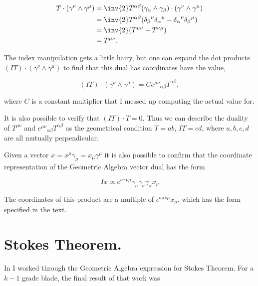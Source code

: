 \begin{align*}
T \cdot (\gamma^\nu \wedge \gamma^\mu)
&= 
\inv{2} T^{\alpha \beta} (\gamma_\alpha \wedge \gamma_\beta ) \cdot (\gamma^\nu \wedge \gamma^\mu) \\
&= 
\inv{2} T^{\alpha \beta} ( {\delta_\beta}^\nu {\delta_\alpha}^\mu -{\delta_\alpha}^\nu {\delta_\beta}^\mu ) \\
&= 
\inv{2} (T^{\mu \nu} - T^{\nu \mu}) \\
&= 
T^{\mu \nu}.
\end{align*}

The index manipulation gets a little hairy, but one can expand the dot products $(I T) \cdot (\gamma^\nu \wedge \gamma^\mu)$ to find that this dual has coordinates have the value,

\begin{equation}\label{eqn:antisymmetricTensorTx:530}
(I T) \cdot (\gamma^\nu \wedge \gamma^\mu) = C {e^{\mu \nu}}_{\alpha \beta} T^{\alpha \beta},
\end{equation}

where $C$ is a constant multiplier that I messed up computing the actual value for.

It is also possible to verify that $(IT) \cdot T = 0$.  Thus we can describe the duality of $T^{\mu \nu}$ and ${e^{\mu \nu}}_{\alpha \beta} T^{\alpha \beta}$ as the geometrical condition $T = a b$, $IT = c d$, where $a, b, c, d$ are all mutually perpendicular.

Given a vector $x = x^\mu \gamma_\mu = x_\mu \gamma^\mu$ it is also possible to confirm that the coordinate representation of the Geometric Algebra vector dual has the form

\begin{equation}\label{eqn:antisymmetricTensorTx:540}
I x \propto e^{\sigma \pi \nu \mu} \gamma_\sigma \gamma_\sigma \gamma_\pi x_\nu
\end{equation}

The coordinates of this product are a multiple of $\epsilon^{\sigma \pi \nu \mu } x_\mu$, which has the form specified in the text.

\section{Stokes Theorem.}

In \cite{stokesNoTensor} I worked through the Geometric Algebra expression for Stokes Theorem.  For a $k-1$ grade blade, the final result of that work was


